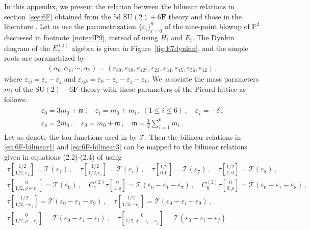 \documentclass[11pt, a4paper]{article}
\newcommand{\tauftn}[2]{\tau\genfrac[]{0pt}{1}{#1}{#2}}
\theoremstyle{definition}
\begin{document}
In this appendix, we present the relation between the bilinear relations in section~\ref{sec:6F} obtained from the 5d $ \mathrm{SU}(2)+6\mathbf{F} $ theory and those in the literature \cite{Masuda:2009}. Let us use the parametrization $ \{\varepsilon_i\}_{i=0}^9 $ of the nine-point blowup of $ \mathbb{P}^2 $ discussed in footnote~\ref{note:dP9}, instead of using $ H_i $ and $ E_i $. The Dynkin diagram of the $ E_7^{(1)} $ algebra is given in Figure~\ref{fig:E7dynkin}, and the simple roots are parametrized by
\begin{align}
    (\alpha_0,\alpha_1,\cdots,\alpha_7) = (\varepsilon_{89} , \varepsilon_{78}, \varepsilon_{127} , \varepsilon_{23}  , \varepsilon_{34}  , \varepsilon_{45}  , \varepsilon_{56}  , \varepsilon_{12} ) \, ,
\end{align}
where $ \varepsilon_{ij} = \varepsilon_i-\varepsilon_j $ and $ \varepsilon_{ijk} = \varepsilon_0-\varepsilon_i-\varepsilon_j-\varepsilon_k $. We associate the mass parameters $ m_i $ of the $ \mathrm{SU}(2)+6\mathbf{F} $ theory with these parameters of the Picard lattice as follows:
\begin{gather}
    \begin{gathered}\label{eq:qE7-mapping}
        \varepsilon_0 = 3m_0 + \mathfrak{m} \, , \quad
        \varepsilon_i = m_0 + m_i \, , \ (1 \leq i \leq 6) \, , \quad
        \varepsilon_7 = -\delta \, , \\
        \varepsilon_8 = 2m_0 \, , \quad
        \varepsilon_9 = m_0 + \mathfrak{m} \, , \quad
        \mathfrak{m} = \frac{1}{2} \sum_{i=1}^6 m_i \, .
    \end{gathered}
\end{gather}
Let us denote the tau-functions used in \cite{Masuda:2009} by $ \mathcal{T} $. Then the bilinear relations in \eqref{eq:6F-bilinear1} and \eqref{eq:6F-bilinear3} can be mapped to the bilinear relations given in equations (2.2)-(2.4) of \cite{Masuda:2009} using 
\begin{gather}
    \tauftn{1/2}{1/2,e_1} = \mathcal{T}(\varepsilon_1) \, , \quad
    \tauftn{1/2}{1/2,e_i} = \mathcal{T}(\varepsilon_i) \, , \quad
    \tauftn{1/2}{0,0} = \mathcal{T}(\varepsilon_7) \, , \quad
    \tauftn{1/2}{1,0} = \mathcal{T}(\varepsilon_8) \, , \nonumber \\
    \tauftn{0}{1/2,\rho+e_1} = \mathcal{T}(\varepsilon_9) \, , \quad
    C_7^{(2)}\tauftn{0}{1,\rho} = \mathcal{T}(\varepsilon_0-\varepsilon_1-\varepsilon_7) \, , \quad
    C_8^{(2)}\tauftn{0}{0,\rho} = \mathcal{T}(\varepsilon_0-\varepsilon_1-\varepsilon_8) \, , \nonumber \\
\tauftn{1/2}{1/2,-e_1} = \mathcal{T}(\varepsilon_0-\varepsilon_1-\varepsilon_9) \, , \quad
    \tauftn{1/2}{1/2,-e_i} = \mathcal{T}(\varepsilon_0-\varepsilon_i-\varepsilon_9) \, , \nonumber \\
    \tauftn{0}{1/2,\rho-e_i} = \mathcal{T}(\varepsilon_0-\varepsilon_1-\varepsilon_i) \, , \quad
    \tauftn{0}{1/2,\lambda-e_i-e_j} = \mathcal{T}(\varepsilon_0-\varepsilon_i-\varepsilon_j)
\end{gather}
\end{document}
